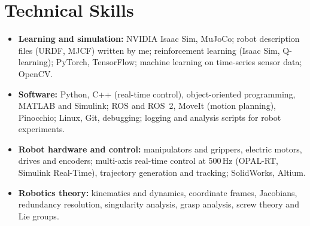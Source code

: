 \documentclass[10pt,letterpaper]{article}
\begin{document}
\section{Technical Skills}
\begin{itemize}
\item \textbf{Learning and simulation:} NVIDIA Isaac Sim, MuJoCo; robot description files (URDF, MJCF) written by me;
reinforcement learning (Isaac Sim, Q-learning); PyTorch, TensorFlow; machine learning on time-series sensor data; OpenCV.
\item \textbf{Software:} Python, C++ (real-time control), object-oriented programming, MATLAB and Simulink; ROS and ROS~2,
MoveIt (motion planning), Pinocchio; Linux, Git, debugging; logging and analysis scripts for robot experiments.
\item \textbf{Robot hardware and control:} manipulators and grippers, electric motors, drives and encoders; multi-axis
real-time control at 500\,Hz (OPAL-RT, Simulink Real-Time), trajectory generation and tracking; SolidWorks, Altium.
\item \textbf{Robotics theory:} kinematics and dynamics, coordinate frames, Jacobians, redundancy resolution, singularity
analysis, grasp analysis, screw theory and Lie groups.
\end{itemize}

\end{document}
